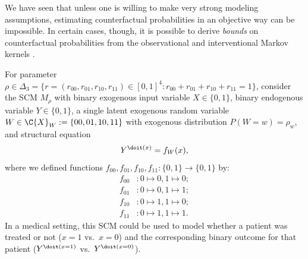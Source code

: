 We have seen that unless one is willing to make very strong modeling assumptions, estimating counterfactual probabilities in an objective way can be impossible.
In certain cases, though, it is possible to derive \emph{bounds} on counterfactual probabilities from the observational and interventional Markov kernels \cite{BalkePearl1994b}.
\begin{Eg}\label{ex:Bounding_counterfactuals}
  For parameter $\rho\in\Delta_3=\{r=(r_{00},r_{01},r_{10},r_{11}) \in [0,1]^4 : r_{00}+r_{01}+r_{10}+r_{11}= 1\}$, consider the SCM $M_\rho$ with binary exogenous input variable $X \in \{0,1\}$, binary endogenous variable $Y \in \{0,1\}$, a single latent exogenous random variable $W \in \C{X}_W := \{00,01,10,11\}$ with exogenous distribution $P(W=w) = \rho_w$,
and structural equation
  $$Y^{\doit(x)} = f_{W}(x),$$
where we defined functions $f_{00},f_{01},f_{10},f_{11} : \{0,1\} \to \{0,1\}$ by:
  \begin{align*}
    f_{00} &: 0 \mapsto 0, 1 \mapsto 0;\\
    f_{01} &: 0 \mapsto 0, 1 \mapsto 1;\\
    f_{10} &: 0 \mapsto 1, 1 \mapsto 0;\\
    f_{11} &: 0 \mapsto 1, 1 \mapsto 1.
  \end{align*}
In a medical setting, this SCM could be used to model whether a patient was treated or not ($x=1$ vs.\ $x=0$) and the corresponding binary outcome for that patient ($Y^{\doit(x=1)}$ vs.\ $Y^{\doit(x=0)}$).


\end{Eg}
